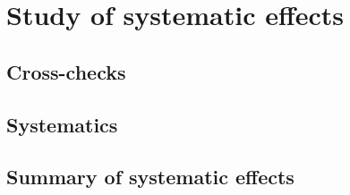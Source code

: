 \section{Study of systematic effects}
\label{sec:measurement_of_sin2beta:systematics}
\subsection{Cross-checks}
\label{sec:measurement_of_sin2beta:systematics:cross_checks}
\subsection{Systematics}
\label{sec:measurement_of_sin2beta:systematics:systematics}
\subsection{Summary of systematic effects}
\label{sec:measurement_of_sin2beta:systematics:summary}
